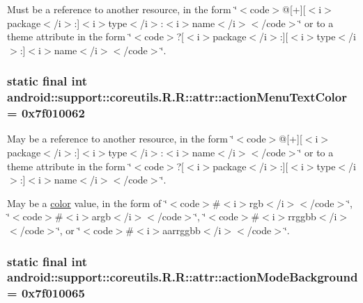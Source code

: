 Must be a reference to another resource, in the form \char`\"{}$<$code$>$@\mbox{[}+\mbox{]}\mbox{[}$<$i$>$package$<$/i$>$:\mbox{]}$<$i$>$type$<$/i$>$:$<$i$>$name$<$/i$>$$<$/code$>$\char`\"{} or to a theme attribute in the form \char`\"{}$<$code$>$?\mbox{[}$<$i$>$package$<$/i$>$:\mbox{]}\mbox{[}$<$i$>$type$<$/i$>$:\mbox{]}$<$i$>$name$<$/i$>$$<$/code$>$\char`\"{}. \hypertarget{classandroid_1_1support_1_1coreutils_1_1_r_1_1attr_3de06473b6b512971efcdda5e0d29662}{
\subsubsection[{actionMenuTextColor}]{\setlength{\rightskip}{0pt plus 5cm}static final int android::support::coreutils.R.R::attr::actionMenuTextColor = 0x7f010062}}
\label{classandroid_1_1support_1_1coreutils_1_1_r_1_1attr_3de06473b6b512971efcdda5e0d29662}


May be a reference to another resource, in the form \char`\"{}$<$code$>$@\mbox{[}+\mbox{]}\mbox{[}$<$i$>$package$<$/i$>$:\mbox{]}$<$i$>$type$<$/i$>$:$<$i$>$name$<$/i$>$$<$/code$>$\char`\"{} or to a theme attribute in the form \char`\"{}$<$code$>$?\mbox{[}$<$i$>$package$<$/i$>$:\mbox{]}\mbox{[}$<$i$>$type$<$/i$>$:\mbox{]}$<$i$>$name$<$/i$>$$<$/code$>$\char`\"{}. 

May be a \hyperlink{classandroid_1_1support_1_1coreutils_1_1_r_1_1color}{color} value, in the form of \char`\"{}$<$code$>$\#$<$i$>$rgb$<$/i$>$$<$/code$>$\char`\"{}, \char`\"{}$<$code$>$\#$<$i$>$argb$<$/i$>$$<$/code$>$\char`\"{}, \char`\"{}$<$code$>$\#$<$i$>$rrggbb$<$/i$>$$<$/code$>$\char`\"{}, or \char`\"{}$<$code$>$\#$<$i$>$aarrggbb$<$/i$>$$<$/code$>$\char`\"{}. \hypertarget{classandroid_1_1support_1_1coreutils_1_1_r_1_1attr_abc38475a562f4d795ed09cbf6857d90}{
\subsubsection[{actionModeBackground}]{\setlength{\rightskip}{0pt plus 5cm}static final int android::support::coreutils.R.R::attr::actionModeBackground = 0x7f010065}}
\label{classandroid_1_1support_1_1coreutils_1_1_r_1_1attr_abc38475a562f4d795ed09cbf6857d90}


